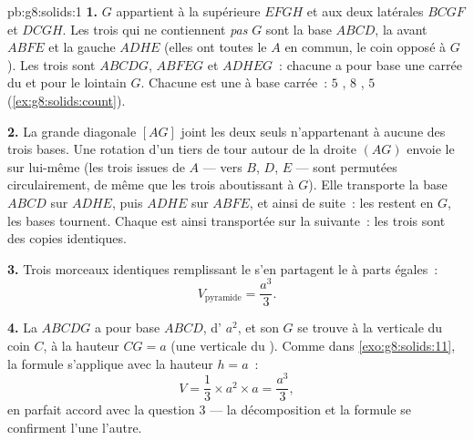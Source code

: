 \begin{solution}{pb:g8:solids:1}
\textbf{1.} $G$ appartient à la  supérieure $EFGH$ et aux deux
 latérales $BCGF$ et $DCGH$. Les trois  qui ne contiennent
\emph{pas} $G$ sont la base $ABCD$, la  avant $ABFE$ et la 
gauche $ADHE$ (elles ont toutes le  $A$ en commun, le coin
opposé à $G$). Les trois  sont $ABCDG$, $ABFEG$ et
$ADHEG$~: chacune a pour base une  carrée du  et pour 
le lointain $G$. Chacune est une  à base carrée~: $5$ ,
$8$ , $5$  (\cref{ex:g8:solids:count}).

\textbf{2.} La grande diagonale $[AG]$ joint les deux seuls 
n'appartenant à aucune des trois bases. Une rotation d'un tiers de
tour autour de la droite $(AG)$ envoie le  sur lui-même (les
trois  issues de $A$ --- vers $B$, $D$, $E$ --- sont permutées
circulairement, de même que les trois  aboutissant à $G$).
Elle transporte la base $ABCD$ sur $ADHE$, puis $ADHE$ sur $ABFE$,
et ainsi de suite~: les  restent en $G$, les bases tournent.
Chaque  est ainsi transportée sur la suivante~: les trois
sont des copies identiques.

\textbf{3.} Trois morceaux identiques remplissant le  s'en
partagent le  à parts égales~:
\[
V_{\text{pyramide}} = \frac{a^3}{3} .
\]

\textbf{4.} La  $ABCDG$ a pour base $ABCD$, d' $a^2$, et
son  $G$ se trouve à la verticale du coin $C$, à la hauteur
$CG = a$ (une  verticale du ). Comme dans
\cref{exo:g8:solids:11}, la formule s'applique avec la hauteur
 $h = a$~:
\[
V = \frac13 \times a^2 \times a = \frac{a^3}{3} ,
\]
en parfait accord avec la question 3 --- la décomposition et la
formule se confirment l'une l'autre.


\end{solution}
